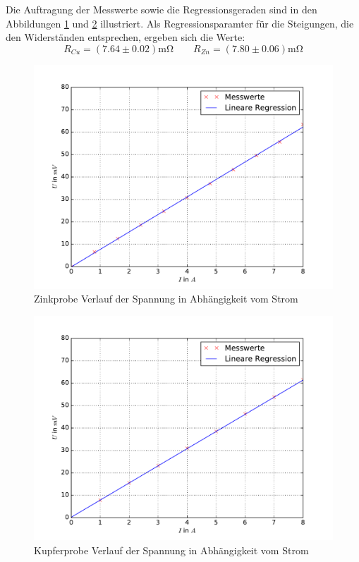 Die Auftragung der Messwerte sowie die Regressionsgeraden sind in den Abbildungen \ref{fig: uri_zink} und \ref{fig: uri_kupfer} illustriert.
Als Regressionsparamter für die Steigungen, die den Widerständen entsprechen, ergeben sich die Werte:
\begin{equation}
  R_{Cu} = (7.64 \pm 0.02)\si{\milli \ohm} \quad \quad R_{Zn} = (7.80 \pm 0.06)\si{\milli \ohm}
\end{equation}
\FloatBarrier
\begin{figure}
  \centering
  \includegraphics[width=\textwidth]{pics/uri_zink.pdf}
  \caption{Zinkprobe Verlauf der Spannung in Abhängigkeit vom Strom}
  \label{fig: uri_zink}
\end{figure}
\begin{figure}
  \centering
  \includegraphics[width=\textwidth]{pics/uri_kupfer.pdf}
  \caption{Kupferprobe Verlauf der Spannung in Abhängigkeit vom Strom}
  \label{fig: uri_kupfer}
\end{figure}



